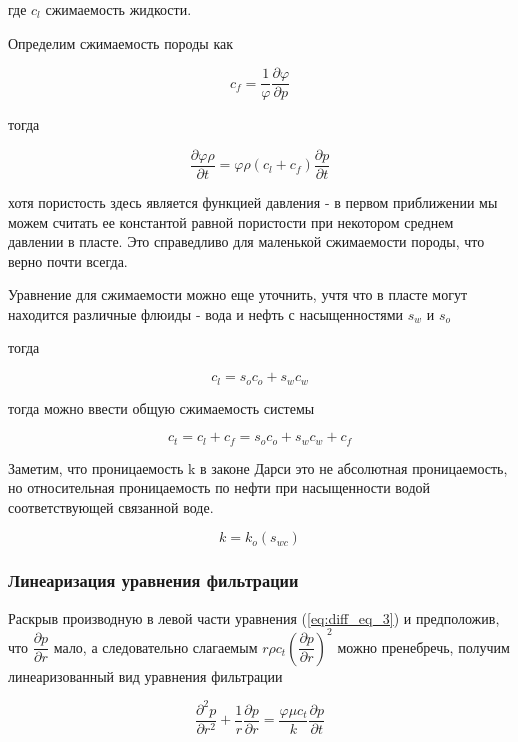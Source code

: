 где $c_l$ сжимаемость жидкости. 

Определим сжимаемость породы как 

$$c_f = \frac{1}{\varphi} \frac{\partial \varphi}{\partial p}$$

тогда 

$$\frac{\partial \varphi \rho}{\partial t}  = \varphi \rho (c_l + c_f) \frac{\partial p}{\partial t}   $$



хотя пористость здесь является функцией давления - в первом приближении мы можем считать ее константой равной пористости при некотором среднем давлении в пласте. Это справедливо для маленькой сжимаемости породы, что верно почти всегда.

Уравнение для сжимаемости можно еще уточнить, учтя что в пласте могут находится различные флюиды - вода и нефть с насыщенностями  $s_w$ и $s_o$

тогда 

$$ c_l = s_o c_o + s_w c_w $$

тогда можно ввести общую сжимаемость системы 

\begin{equation} \label{eq:total_compressibility_definition_1}
	 c_t = c_l + c_f = s_o c_o + s_w c_w  + c_f 
\end{equation}

Заметим, что проницаемость k в законе Дарси это не абсолютная проницаемость, но относительная проницаемость по нефти при насыщенности водой соответствующей связанной воде.  

$$ k= k_o (s_{wc}) $$

\subsubsection{Линеаризация уравнения фильтрации}

Раскрыв производную в левой части уравнения  (\ref{eq:diff_eq_3})  и предположив, что $\dfrac{\partial p}{\partial r}$ мало, а следовательно слагаемым  $ r \rho c_t \left( \dfrac{\partial p}{\partial r} \right)^2 $ можно пренебречь, получим линеаризованный вид уравнения фильтрации

\begin{equation} \label{eq:diff_eq_lin}
\frac{\partial^2 p}{\partial r^2} + \frac{1}{r} \frac{\partial p}{\partial r}= \frac{\varphi \mu c_t}{k} \frac{\partial p}{\partial t}
\end{equation}



